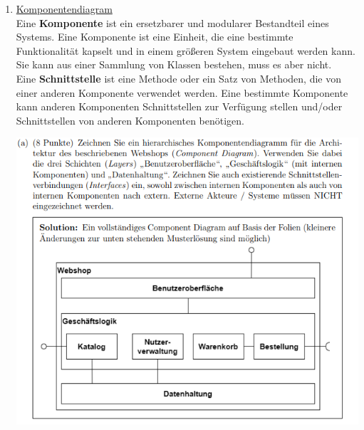 \documentclass{article}
\begin{document}
  \begin{enumerate}[label=\alph*)]
   \item \underline{Komponentendiagram}\\
   
   Eine \textbf{Komponente} ist ein ersetzbarer und modularer Bestandteil eines Systems. Eine Komponente ist eine Einheit, die eine bestimmte Funktionalität kapselt und in einem größeren System eingebaut werden kann. Sie kann aus einer Sammlung von Klassen bestehen, muss es aber nicht.\\
   Eine \textbf{Schnittstelle} ist eine Methode oder ein Satz von Methoden, die von einer anderen Komponente verwendet werden. Eine bestimmte Komponente kann anderen Komponenten Schnittstellen zur Verfügung stellen und/oder Schnittstellen von anderen Komponenten benötigen.
   
 \includegraphics[scale=1]{media/componentDiagram.png}
   

\end{enumerate}
\end{document}
